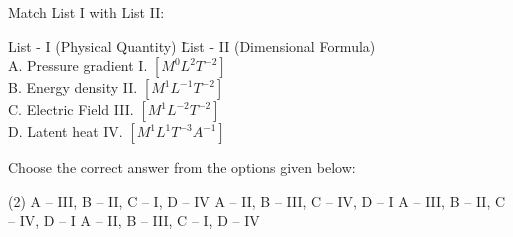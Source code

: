 \item Match List I with List II:
    \begin{center}
    \end{center}
    \begin{tabbing}
        List - I (Physical Quantity) \hspace{4cm} \= List - II (Dimensional Formula) \\
        A. Pressure gradient \> I. \(\left[ M^0 L^2 T^{-2} \right]\) \\
        B. Energy density \> II. \(\left[ M^1 L^{-1} T^{-2} \right]\) \\
        C. Electric Field \> III. \(\left[ M^1 L^{-2} T^{-2} \right]\) \\
        D. Latent heat \> IV. \(\left[ M^1 L^1 T^{-3} A^{-1} \right]\) \\
    \end{tabbing}
    Choose the correct answer from the options given below:
    \begin{tasks}(2)
        \task A – III, B – II, C – I, D – IV
        \task A – II, B – III, C – IV, D – I
        \task A – III, B – II, C – IV, D – I
        \task A – II, B – III, C – I, D – IV
    \end{tasks}